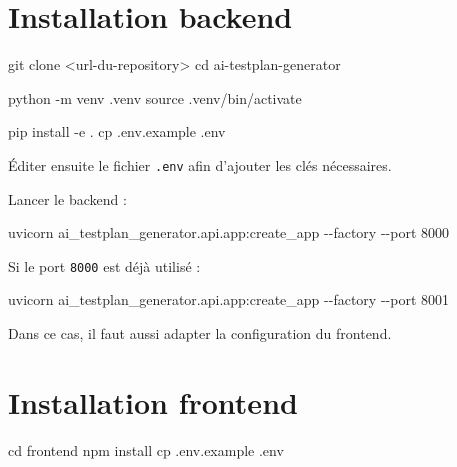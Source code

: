 \documentclass[
  french,
]{report}
\newenvironment{Shaded}{}{}
\newcommand{\AttributeTok}[1]{\textcolor[rgb]{0.49,0.56,0.16}{#1}}
\newcommand{\BuiltInTok}[1]{\textcolor[rgb]{0.00,0.50,0.00}{#1}}
\newcommand{\ExtensionTok}[1]{#1}
\newcommand{\FunctionTok}[1]{\textcolor[rgb]{0.02,0.16,0.49}{#1}}
\newcommand{\NormalTok}[1]{#1}
\newcommand{\OperatorTok}[1]{\textcolor[rgb]{0.40,0.40,0.40}{#1}}
\begin{document}
\section{Installation backend}\label{installation-backend}

\begin{Shaded}
\begin{Highlighting}[]
\FunctionTok{git}\NormalTok{ clone }\OperatorTok{\textless{}}\NormalTok{url{-}du{-}repository}\OperatorTok{\textgreater{}}
\BuiltInTok{cd}\NormalTok{ ai{-}testplan{-}generator}

\ExtensionTok{python} \AttributeTok{{-}m}\NormalTok{ venv .venv}
\BuiltInTok{source}\NormalTok{ .venv/bin/activate}

\ExtensionTok{pip}\NormalTok{ install }\AttributeTok{{-}e}\NormalTok{ .}
\FunctionTok{cp}\NormalTok{ .env.example .env}
\end{Highlighting}
\end{Shaded}

Éditer ensuite le fichier \texttt{.env} afin d'ajouter les clés
nécessaires.

Lancer le backend :

\begin{Shaded}
\begin{Highlighting}[]
\ExtensionTok{uvicorn}\NormalTok{ ai\_testplan\_generator.api.app:create\_app }\AttributeTok{{-}{-}factory} \AttributeTok{{-}{-}port}\NormalTok{ 8000}
\end{Highlighting}
\end{Shaded}

Si le port \texttt{8000} est déjà utilisé :

\begin{Shaded}
\begin{Highlighting}[]
\ExtensionTok{uvicorn}\NormalTok{ ai\_testplan\_generator.api.app:create\_app }\AttributeTok{{-}{-}factory} \AttributeTok{{-}{-}port}\NormalTok{ 8001}
\end{Highlighting}
\end{Shaded}

Dans ce cas, il faut aussi adapter la configuration du frontend.

\section{Installation frontend}\label{installation-frontend}

\begin{Shaded}
\begin{Highlighting}[]
\BuiltInTok{cd}\NormalTok{ frontend}
\ExtensionTok{npm}\NormalTok{ install}
\FunctionTok{cp}\NormalTok{ .env.example .env}
\end{Highlighting}
\end{Shaded}
\end{document}

